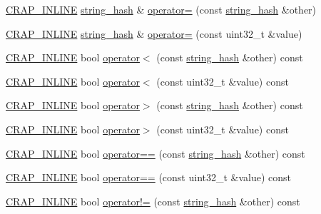 \begin{DoxyCompactItemize}
\item 
\hyperlink{config__x86_8h_a5a40526b8d842e7ff731509998bb0f1c}{C\+R\+A\+P\+\_\+\+I\+N\+L\+I\+N\+E} \hyperlink{classcrap_1_1string__hash}{string\+\_\+hash} \& \hyperlink{classcrap_1_1string__hash_aac0e44cc2143b1b82201a2577d7cae33}{operator=} (const \hyperlink{classcrap_1_1string__hash}{string\+\_\+hash} \&other)
\item 
\hyperlink{config__x86_8h_a5a40526b8d842e7ff731509998bb0f1c}{C\+R\+A\+P\+\_\+\+I\+N\+L\+I\+N\+E} \hyperlink{classcrap_1_1string__hash}{string\+\_\+hash} \& \hyperlink{classcrap_1_1string__hash_a500a4853a4c2f8dcf385119b0706b050}{operator=} (const uint32\+\_\+t \&value)
\item 
\hyperlink{config__x86_8h_a5a40526b8d842e7ff731509998bb0f1c}{C\+R\+A\+P\+\_\+\+I\+N\+L\+I\+N\+E} bool \hyperlink{classcrap_1_1string__hash_a3bd30a882da81bd4e36bdb4eebb0a7af}{operator$<$} (const \hyperlink{classcrap_1_1string__hash}{string\+\_\+hash} \&other) const 
\item 
\hyperlink{config__x86_8h_a5a40526b8d842e7ff731509998bb0f1c}{C\+R\+A\+P\+\_\+\+I\+N\+L\+I\+N\+E} bool \hyperlink{classcrap_1_1string__hash_af4b2544ce503bd03a0f724fea8675d20}{operator$<$} (const uint32\+\_\+t \&value) const 
\item 
\hyperlink{config__x86_8h_a5a40526b8d842e7ff731509998bb0f1c}{C\+R\+A\+P\+\_\+\+I\+N\+L\+I\+N\+E} bool \hyperlink{classcrap_1_1string__hash_a69fe65ecf46d47c48743a3223a145ccc}{operator$>$} (const \hyperlink{classcrap_1_1string__hash}{string\+\_\+hash} \&other) const 
\item 
\hyperlink{config__x86_8h_a5a40526b8d842e7ff731509998bb0f1c}{C\+R\+A\+P\+\_\+\+I\+N\+L\+I\+N\+E} bool \hyperlink{classcrap_1_1string__hash_a7d20232b5e5e5f5b9c9228ce4e2e4c6d}{operator$>$} (const uint32\+\_\+t \&value) const 
\item 
\hyperlink{config__x86_8h_a5a40526b8d842e7ff731509998bb0f1c}{C\+R\+A\+P\+\_\+\+I\+N\+L\+I\+N\+E} bool \hyperlink{classcrap_1_1string__hash_ae47fcfce38976648ee9af0bf3f7d4498}{operator==} (const \hyperlink{classcrap_1_1string__hash}{string\+\_\+hash} \&other) const 
\item 
\hyperlink{config__x86_8h_a5a40526b8d842e7ff731509998bb0f1c}{C\+R\+A\+P\+\_\+\+I\+N\+L\+I\+N\+E} bool \hyperlink{classcrap_1_1string__hash_a5caf2e315791e3a53c63e45b463e7835}{operator==} (const uint32\+\_\+t \&value) const 
\item 
\hyperlink{config__x86_8h_a5a40526b8d842e7ff731509998bb0f1c}{C\+R\+A\+P\+\_\+\+I\+N\+L\+I\+N\+E} bool \hyperlink{classcrap_1_1string__hash_a432008b54cebf62dcc25c4f30498dcd4}{operator!=} (const \hyperlink{classcrap_1_1string__hash}{string\+\_\+hash} \&other) const 

\end{DoxyCompactItemize}
